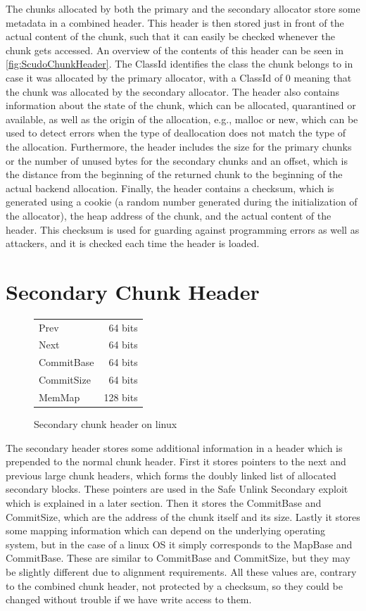 \documentclass[a4paper,11pt,oneside]{report}
\begin{document}
The chunks allocated by both the primary and the secondary allocator store some metadata
in a combined header. This header is then stored just in front of the actual content of
the chunk, such that it can easily be checked whenever the chunk gets accessed. An
overview of the contents of this header can be seen in \autoref{fig:ScudoChunkHeader}. The
ClassId identifies the class the chunk belongs to in case it was allocated by the primary
allocator, with a ClassId of 0 meaning that the chunk was allocated by the secondary
allocator. The header also contains information about the state of the chunk, which can be
allocated, quarantined or available, as well as the origin of the allocation, e.g., malloc
or new, which can be used to detect errors when the type of deallocation does not match
the type of the allocation. Furthermore, the header includes the size for the primary
chunks or the number of unused bytes for the secondary chunks and an offset, which is the
distance from the beginning of the returned chunk to the beginning of the actual backend
allocation.  Finally, the header contains a checksum, which is generated using a cookie (a
random number generated during the initialization of the allocator), the heap address of
the chunk, and the actual content of the header. This checksum is used for guarding
against programming errors as well as attackers, and it is checked each time the header is
loaded.

\section{Secondary Chunk Header}

\begin{figure}[h]
  \centering
  \begin{tabular}{l r}
    \toprule
    Prev & 64 bits \\
    Next & 64 bits \\
    CommitBase & 64 bits \\
    CommitSize & 64 bits \\
    MemMap & 128 bits \\
    \bottomrule
  \end{tabular}
  \caption{Secondary chunk header on linux}\label{fig:ScudoSecondaryChunkHeader}
\end{figure}

The secondary header stores some additional information in a header which is prepended to
the normal chunk header. First it stores pointers to the next and previous large chunk
headers, which forms the doubly linked list of allocated secondary blocks. These pointers
are used in the Safe Unlink Secondary exploit which is explained in a later section. Then
it stores the CommitBase and CommitSize, which are the address of the chunk itself and its
size. Lastly it stores some mapping information which can depend on the underlying
operating system, but in the case of a linux OS it simply corresponds to the MapBase and
CommitBase. These are similar to CommitBase and CommitSize, but they may be slightly
different due to alignment requirements. All these values are, contrary to the combined
chunk header, not protected by a checksum, so they could be changed without trouble if we
have write access to them.
\end{document}
